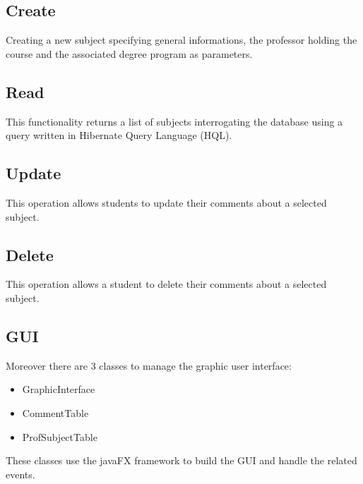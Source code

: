 \documentclass[a4paper, oneside]{article}
\begin{document}
\subsection{Create}
Creating a new subject specifying general informations, the professor holding the course and the associated degree program as parameters.\\
\vspace{2mm}

\vspace{5mm}

\subsection{Read}
This functionality returns a list of subjects interrogating the database using a query written in Hibernate Query Language (HQL).\\
\vspace{2mm}

\vspace{5mm}

\subsection{Update}
This operation allows students to update their comments about a selected subject.\\
\vspace{2mm}

\vspace{5mm}

\subsection{Delete}
This operation allows a student to delete their comments about a selected subject.\\
\vspace{2mm}

\vspace{5mm}

\subsection{GUI}
Moreover there are 3 classes to manage the graphic user interface: 
\begin{itemize}
\item GraphicInterface
\item CommentTable
\item ProfSubjectTable
\end{itemize}
 These classes use the javaFX framework to build the GUI and handle the related events.
\end{document}

